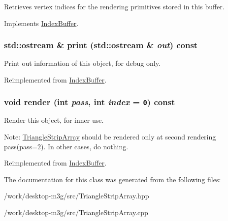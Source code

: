 Retrieves vertex indices for the rendering primitives stored in this buffer. 

Implements \hyperlink{classm3g_1_1IndexBuffer_59fb1eca8810ea3b028735c5dce53fca}{IndexBuffer}.\hypertarget{classm3g_1_1TriangleStripArray_6fea17fa1532df3794f8cb39cb4f911f}{
\subsubsection[{print}]{\setlength{\rightskip}{0pt plus 5cm}std::ostream \& print (std::ostream \& {\em out}) const}}
\label{classm3g_1_1TriangleStripArray_6fea17fa1532df3794f8cb39cb4f911f}


Print out information of this object, for debug only. 

Reimplemented from \hyperlink{classm3g_1_1IndexBuffer_6fea17fa1532df3794f8cb39cb4f911f}{IndexBuffer}.\hypertarget{classm3g_1_1TriangleStripArray_1efcb1973989d9963d5bd6d03065d389}{
\subsubsection[{render}]{\setlength{\rightskip}{0pt plus 5cm}void render (int {\em pass}, \/  int {\em index} = {\tt 0}) const}}
\label{classm3g_1_1TriangleStripArray_1efcb1973989d9963d5bd6d03065d389}


Render this object, for inner use.

Note: \hyperlink{classm3g_1_1TriangleStripArray}{TriangleStripArray} should be rendered only at second rendering pass(pass=2). In other cases, do nothing. 

Reimplemented from \hyperlink{classm3g_1_1IndexBuffer_1efcb1973989d9963d5bd6d03065d389}{IndexBuffer}.

The documentation for this class was generated from the following files:\begin{CompactItemize}
\item 
/work/desktop-m3g/src/TriangleStripArray.hpp\item 
/work/desktop-m3g/src/TriangleStripArray.cpp\end{CompactItemize}

